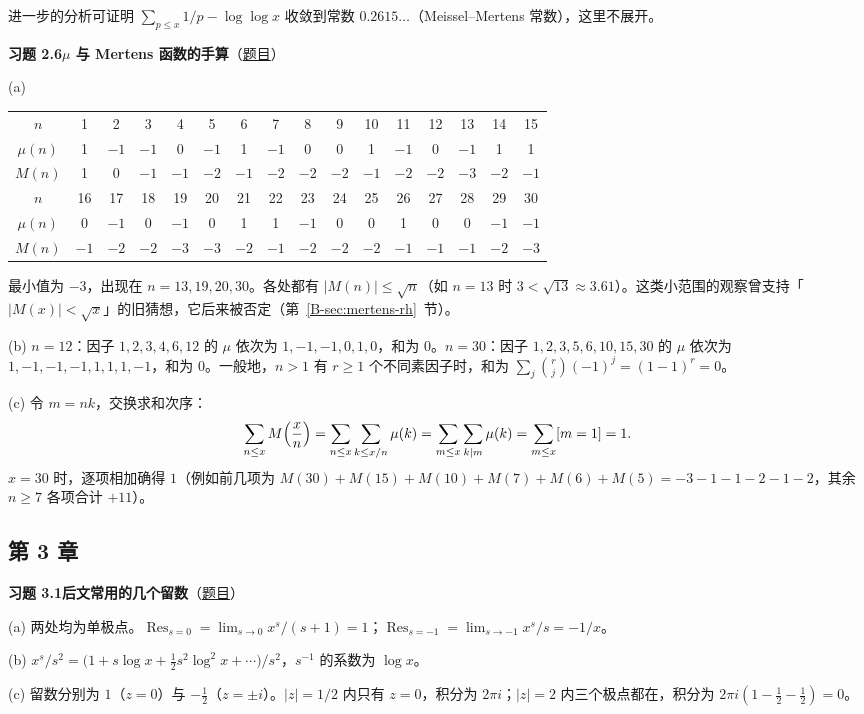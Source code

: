\documentclass[11pt,a4paper]{article}
\DeclareMathOperator{\Res}{Res}
\newcommand{\bref}[1]{\ref*{B-#1}}
\newcommand{\Sol}[2]{%
  \par\addvspace{1.2em}\noindent
  \hypertarget{s:#1}{}\textbf{习题 #1\quad #2}\hfill{\small（\hyperlink{q:#1}{题目}）}\par
  \nopagebreak\smallskip}
\begin{document}
进一步的分析可证明 $\sum_{p\le x}1/p-\log\log x$ 收敛到常数 $0.2615\ldots$（Meissel--Mertens 常数），这里不展开。

\Sol{2.6}{$\mu$ 与 Mertens 函数的手算}
(a)
\begin{center}
\small
\begin{tabular}{@{}c*{15}{c}@{}}
\toprule
$n$ & 1&2&3&4&5&6&7&8&9&10&11&12&13&14&15\\
$\mu(n)$ & 1&$-1$&$-1$&0&$-1$&1&$-1$&0&0&1&$-1$&0&$-1$&1&1\\
$M(n)$ & 1&0&$-1$&$-1$&$-2$&$-1$&$-2$&$-2$&$-2$&$-1$&$-2$&$-2$&$-3$&$-2$&$-1$\\
\midrule
$n$ & 16&17&18&19&20&21&22&23&24&25&26&27&28&29&30\\
$\mu(n)$ & 0&$-1$&0&$-1$&0&1&1&$-1$&0&0&1&0&0&$-1$&$-1$\\
$M(n)$ & $-1$&$-2$&$-2$&$-3$&$-3$&$-2$&$-1$&$-2$&$-2$&$-2$&$-1$&$-1$&$-1$&$-2$&$-3$\\
\bottomrule
\end{tabular}
\end{center}
最小值为 $-3$，出现在 $n=13,19,20,30$。各处都有 $|M(n)|\le\sqrt n$（如 $n=13$ 时 $3<\sqrt{13}\approx3.61$）。这类小范围的观察曾支持「$|M(x)|<\sqrt x$」的旧猜想，它后来被否定（第~\bref{sec:mertens-rh}~节）。

(b) $n=12$：因子 $1,2,3,4,6,12$ 的 $\mu$ 依次为 $1,-1,-1,0,1,0$，和为 $0$。$n=30$：因子 $1,2,3,5,6,10,15,30$ 的 $\mu$ 依次为 $1,-1,-1,-1,1,1,1,-1$，和为 $0$。一般地，$n>1$ 有 $r\ge1$ 个不同素因子时，和为 $\sum_j\binom rj(-1)^j=(1-1)^r=0$。

(c) 令 $m=nk$，交换求和次序：
\[
  \sum_{n\le x}M\Bigl(\frac xn\Bigr)=\sum_{n\le x}\sum_{k\le x/n}\mu(k)=\sum_{m\le x}\sum_{k\mid m}\mu(k)=\sum_{m\le x}[m=1]=1 .
\]
$x=30$ 时，逐项相加确得 $1$（例如前几项为 $M(30)+M(15)+M(10)+M(7)+M(6)+M(5)=-3-1-1-2-1-2$，其余 $n\ge7$ 各项合计 $+11$）。

\subsection*{第 3 章}

\Sol{3.1}{后文常用的几个留数}
(a) 两处均为单极点。$\Res_{s=0}=\lim_{s\to0}x^s/(s+1)=1$；$\Res_{s=-1}=\lim_{s\to-1}x^s/s=-1/x$。

(b) $x^s/s^2=\bigl(1+s\log x+\tfrac12s^2\log^2x+\cdots\bigr)/s^2$，$s^{-1}$ 的系数为 $\log x$。

(c) 留数分别为 $1$（$z=0$）与 $-\tfrac12$（$z=\pm i$）。$|z|=1/2$ 内只有 $z=0$，积分为 $2\pi i$；$|z|=2$ 内三个极点都在，积分为 $2\pi i(1-\tfrac12-\tfrac12)=0$。
\end{document}
